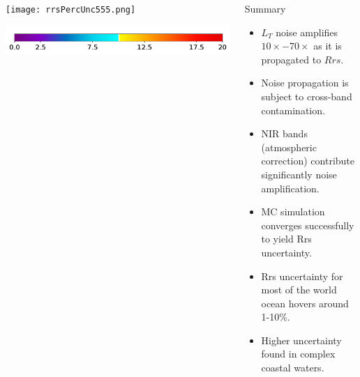 \documentclass[final]{beamer}
\newlength{\sepwid}
\newlength{\onecolwid}
\newlength{\twocolwid}
\begin{document}
\begin{frame}[t]
\begin{columns}[t]
\begin{column}{\twocolwid}
\begin{framed}
\begin{center}

\texttt{[image: rrsPercUnc555.png]}

\includegraphics[trim =0 10 0 0,clip,width=0.5\linewidth,keepaspectratio]{rrsUNCcolorbar.png}
\end{center}
\end{framed}

\begin{columns}[t,totalwidth=\twocolwid] %
\begin{column}{\onecolwid} %







\end{column} %

\end{columns} %

\end{column} %


\begin{column}{\onecolwid} %

\begin{block}{Summary}
\begin{itemize}
\item $L_T$ noise amplifies $10\times - 70\times$ as it is propagated to $Rrs$.
\item Noise propagation is subject to cross-band contamination.
\item NIR bands (atmospheric correction) contribute significantly  noise amplification. 
\item MC simulation converges successfully to yield Rrs uncertainty. 
\item Rrs uncertainty for most of the world ocean hovers around 1-10\%.
\item Higher uncertainty found in complex coastal waters.
\end{itemize}
\end{block}


\end{column}
\end{columns}
\end{frame}
\end{document}
